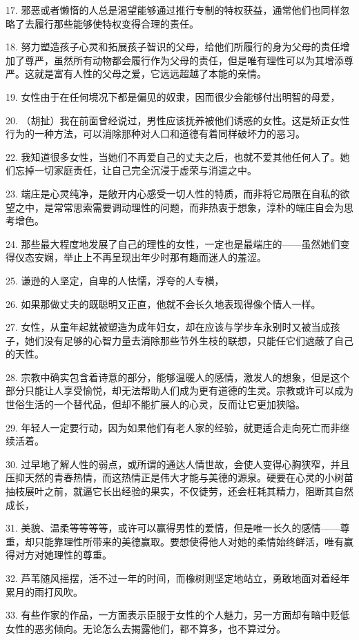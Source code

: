 17. 邪恶或者懒惰的人总是渴望能够通过推行专制的特权获益，通常他们也同样忽略了去履行那些能够使特权变得合理的责任。

18. 努力塑造孩子心灵和拓展孩子智识的父母，给他们所履行的身为父母的责任增加了尊严，虽然所有动物都会履行作为父母的责任，但是唯有理性可以为其增添尊严。这就是富有人性的父母之爱，它远远超越了本能的亲情。

19. 女性由于在任何境况下都是偏见的奴隶，因而很少会能够付出明智的母爱，

20. （胡扯）我在前面曾经说过，男性应该抚养被他们诱惑的女性。这是矫正女性行为的一种方法，可以消除那种对人口和道德有着同样破坏力的恶习。

22. 我知道很多女性，当她们不再爱自己的丈夫之后，也就不爱其他任何人了。她们忘掉一切家庭责任，让自己完全沉浸于虚荣与消遣之中。

23. 端庄是心灵纯净，是敞开内心感受一切人性的特质，而非将它局限在自私的欲望之中，是常常思索需要调动理性的问题，而非热衷于想象，淳朴的端庄自会为思考增色。

24. 那些最大程度地发展了自己的理性的女性，一定也是最端庄的——虽然她们变得仪态安娴，举止上不再呈现出年少时那有趣而迷人的羞涩。

25. 谦逊的人坚定，自卑的人怯懦，浮夸的人专横，

26. 如果那做丈夫的既聪明又正直，他就不会长久地表现得像个情人一样。

27. 女性，从童年起就被塑造为成年妇女，却在应该与学步车永别时又被当成孩子，她们没有足够的心智力量去消除那些节外生枝的联想，只能任它们遮蔽了自己的天性。

28. 宗教中确实包含着诗意的部分，能够温暖人的感情，激发人的想象，但是这个部分只能让人享受愉悦，却无法帮助人们成为更有道德的生灵。宗教或许可以成为世俗生活的一个替代品，但却不能扩展人的心灵，反而让它更加狭隘。

29. 年轻人一定要行动，因为如果他们有老人家的经验，就更适合走向死亡而非继续活着。

30. 过早地了解人性的弱点，或所谓的通达人情世故，会使人变得心胸狭窄，并且压抑天然的青春热情，而这热情正是伟大才能与美德的源泉。硬要在心灵的小树苗抽枝展叶之前，就逼它长出经验的果实，不仅徒劳，还会枉耗其精力，阻断其自然成长，

31. 美貌、温柔等等等等，或许可以赢得男性的爱情，但是唯一长久的感情——尊重，却只能靠理性所带来的美德赢取。要想使得他人对她的柔情始终鲜活，唯有赢得对方对她理性的尊重。

32. 芦苇随风摇摆，活不过一年的时间，而橡树则坚定地站立，勇敢地面对着经年累月的雨打风吹。

33. 有些作家的作品，一方面表示臣服于女性的个人魅力，另一方面却有暗中贬低女性的恶劣倾向。无论怎么去揭露他们，都不算多，也不算过分。

